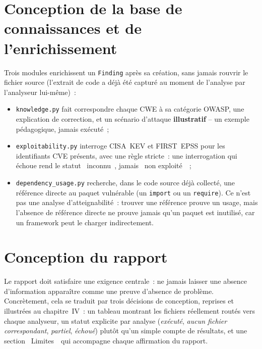 \documentclass[12pt,a4paper,oneside]{report}
\begin{document}
\section{Conception de la base de connaissances et de l'enrichissement}
Trois modules enrichissent un \texttt{Finding} apr\`es sa cr\'eation, sans jamais rouvrir le fichier source (l'extrait de code a d\'ej\`a \'et\'e captur\'e au moment de l'analyse par l'analyseur lui-m\^eme)~:
\begin{itemize}
\item \texttt{knowledge.py} fait correspondre chaque CWE \`a sa cat\'egorie OWASP, une explication de correction, et un sc\'enario d'attaque \textbf{illustratif} -- un exemple p\'edagogique, jamais ex\'ecut\'e~;
\item \texttt{exploitability.py} interroge CISA~KEV et FIRST~EPSS pour les identifiants CVE pr\'esents, avec une r\`egle stricte~: une interrogation qui \'echoue rend le statut \guillemotleft~inconnu~\guillemotright, jamais \guillemotleft~non exploit\'e~\guillemotright~;
\item \texttt{dependency\_usage.py} recherche, dans le code source d\'ej\`a collect\'e, une r\'ef\'erence directe au paquet vuln\'erable (un \texttt{import} ou un \texttt{require}). Ce n'est pas une analyse d'atteignabilit\'e~: trouver une r\'ef\'erence prouve un usage, mais l'absence de r\'ef\'erence directe ne prouve jamais qu'un paquet est inutilis\'e, car un framework peut le charger indirectement.
\end{itemize}

\section{Conception du rapport}
Le rapport doit satisfaire une exigence centrale~: ne jamais laisser une absence d'information appara\^itre comme une preuve d'absence de probl\`eme. Concr\`etement, cela se traduit par trois d\'ecisions de conception, reprises et illustr\'ees au chapitre~IV~: un tableau montrant les fichiers r\'eellement rout\'es vers chaque analyseur, un statut explicite par analyse (\emph{ex\'ecut\'e}, \emph{aucun fichier correspondant}, \emph{partiel}, \emph{\'echou\'e}) plut\^ot qu'un simple compte de r\'esultats, et une section \guillemotleft~Limites~\guillemotright\ qui accompagne chaque affirmation du rapport.


\end{document}
